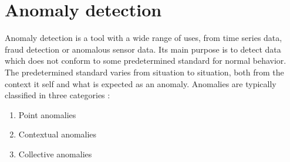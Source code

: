 \section*{Anomaly detection}
Anomaly detection is a tool with a wide range of uses, from time series data, fraud detection or anomalous sensor data. 
Its main purpose is to detect data which does not conform to some predetermined standard for normal behavior. 
The predetermined standard varies from situation to situation, both from the context it self and what is expected as an anomaly. 
Anomalies are typically classified in three categories \cite{anom_detec}:


\begin{enumerate}
    \item Point anomalies
    \item Contextual anomalies
    \item Collective anomalies
\end{enumerate}


